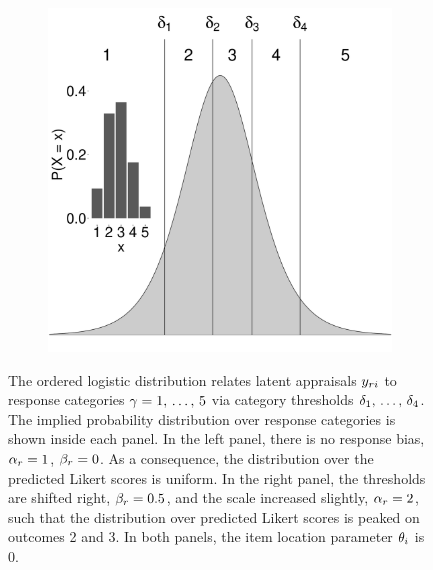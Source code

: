\documentclass[a4paper,usenames,dvipsnames]{article}
\newenvironment{revision}{\color{teal}}{\color{black}}
\begin{document}
\begin{figure}[!ht]
\begin{subfigure}{.5\textwidth}
		\includegraphics[width=.97\textwidth]{figures/orderedLogisticBiased.pdf}
	\end{subfigure}
	\caption{
		\begin{revision}The ordered logistic distribution relates latent appraisals $y_{ri}$ to response categories $\gamma = 1,\,\dots,\,5$  via category thresholds $\delta_1,\,\dots,\,\delta_4$.\end{revision}
		The implied probability distribution over response categories is shown inside each panel. In the left panel, there is no response bias, $\alpha_r = 1$, $\beta_r = 0$. As a consequence, the distribution over the predicted Likert scores is uniform. In the right panel, the thresholds are shifted right, $\beta_r = 0.5$, and the scale increased slightly, $\alpha_r = 2$, such that the distribution over predicted Likert scores is peaked on outcomes 2 and 3. \begin{revision}In both panels, the item location parameter $\theta_i$ is 0.\end{revision}}
	\label{fig:orderedLogistic}
\end{figure}
\end{document}
